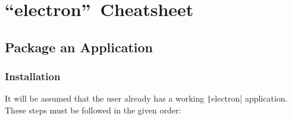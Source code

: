 \section{\textquotedblleft electron\textquotedblright\ Cheatsheet}



\subsection{Package an Application}


\subsubsection{Installation}

It will be assumed that the user already has a working
\texttt|electron| application. These steps must be followed in the given order:


